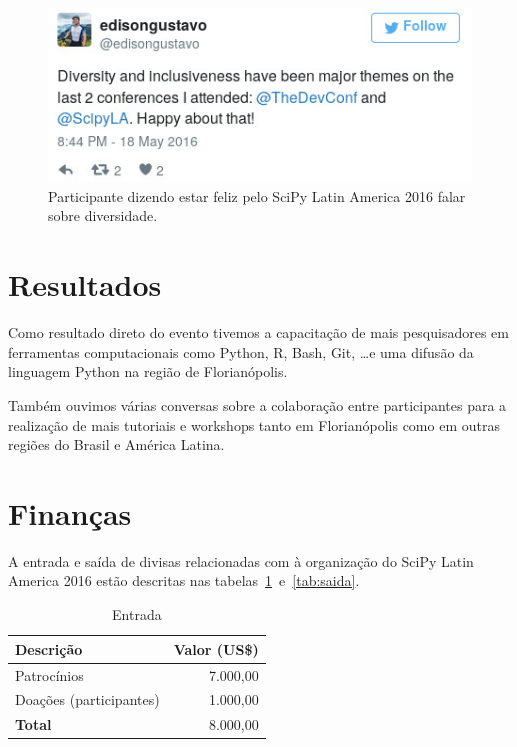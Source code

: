 \documentclass[12pt]{article}
\begin{document}
\begin{figure}[!htb]
\center
\includegraphics[height=.3\textheight]{tweet-diversidade.jpg}
\caption{Participante dizendo estar feliz pelo SciPy Latin America 2016 falar
sobre diversidade.}
\end{figure}

\clearpage
\newpage

\section*{Resultados}

Como resultado direto do evento tivemos a capacitação de mais pesquisadores em
ferramentas computacionais como Python, R, Bash, Git, \ldots e uma difusão da
linguagem Python na região de Florianópolis.

Também ouvimos várias conversas sobre a colaboração entre participantes
para a realização de mais tutoriais e workshops tanto em Florianópolis
como em outras regiões do Brasil e América Latina.

\clearpage
\newpage

\section*{Finanças}

A entrada e saída de divisas relacionadas com à organização do SciPy Latin
America 2016 estão descritas nas tabelas~\ref{tab:entrada}~e~\ref{tab:saida}.

\begin{table}[!htb]
  \center
  \caption{Entrada} \label{tab:entrada}
  \begin{tabular}{m{9cm}@{} @{}r}
     \toprule
     \textbf{Descrição} & \textbf{Valor (US\$)} \\
     \midrule
     Patrocínios & 7.000,00 \\
     Doações (participantes) & 1.000,00 \\
     \midrule
     \textbf{Total} & 8.000,00 \\
     \bottomrule
   \end{tabular}
\end{table}
\end{document}
